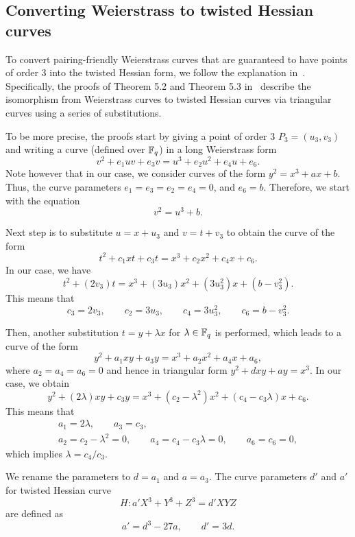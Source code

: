 

\subsection{Converting Weierstrass to twisted Hessian curves}
\label{subsec:w2h}

To convert pairing-friendly Weierstrass curves that are guaranteed to have points of order 3
into the twisted Hessian form, we follow the explanation in~\cite{2015/hessian}.
Specifically, the proofs of Theorem 5.2 and {Theorem 5.3} in~\cite{2015/hessian} describe the isomorphism from
Weierstrass curves to twisted Hessian curves via triangular curves using a series of substitutions.

To be more precise, the proofs start by giving a point of order 3 $P_3 = (u_3,v_3)$ and
writing a curve (defined over $\mathbb{F}_{q}$) in a long Weierstrass form
$$ v^2 + e_1 uv + e_3 v = u^3 + e_2 u^2 + e_4 u + e_6. $$
Note however that in our case, we consider curves of the form $y^2 = x^3 + ax + b$.
Thus, the curve parameters $e_1 = e_3 = e_2 = e_4 = 0$, and $e_6 = b$.
Therefore, we start with the equation
$$v^2 = u^3 + b.$$

Next step is to substitute $u = x + u_3$ and $v = t + v_3$
to obtain the curve of the form
$$ t^2 + c_1 xt + c_3 t = x^3 + c_2 x^2 + c_4 x + c_6. $$
In our case, we have
$$ t^2 + (2v_3)t = x^3 + (3u_3)x^2 + (3u_3^2)x + (b-v_3^2). $$
This means that
$$ c_3 = 2v_3, \qquad c_2 = 3u_3, \qquad c_4 = 3u_3^2, \qquad c_6 = b-v_3^2. $$

Then, another substitution $t = y + \lambda x$ for $\lambda \in \mathbb{F}_{q}$ is performed,
which leads to a curve of the form
$$ y^2 + a_1 xy + a_3 y = x^3 + a_2 x^2 + a_4 x + a_6, $$
where $a_2 = a_4 = a_6 = 0$ and hence in triangular form
$y^2 + dxy + ay = x^3$.
In our case, we obtain
$$ y^2 + (2\lambda)xy + c_3 y = x^3 + (c_2 - \lambda^2)x^2 + (c_4 - c_3 \lambda)x + c_6. $$
This means that
\begin{gather*}
a_1 = 2\lambda, \qquad a_3 = c_3, \\
a_2 = c_2 - \lambda^2 = 0, \qquad a_4 = c_4 - c_3 \lambda = 0, \qquad a_6 = c_6 = 0,
\end{gather*}
which implies $\lambda = c_4 / c_3$.

We rename the parameters to $d = a_1$ and $a = a_3$.
The curve parameters $d'$ and $a'$ for twisted Hessian curve
$$ H: a'X^3 + Y^3 + Z^3 = d'XYZ$$
are defined as
$$ a' = d^3 - 27a, \qquad d' = 3d. $$

